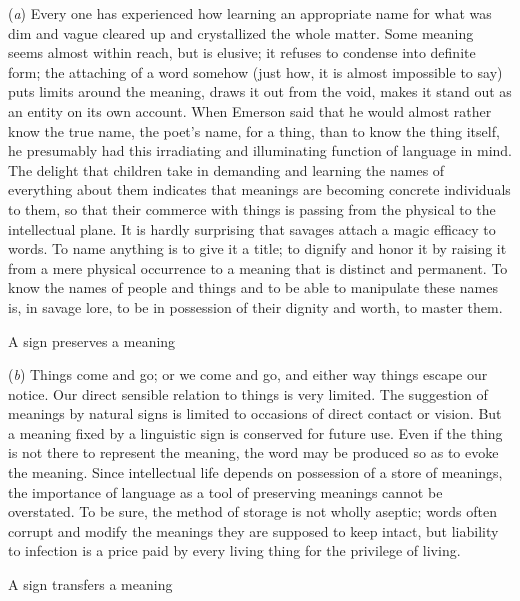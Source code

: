 \documentclass[letterpaper]{book}
\begin{document}
(\emph{a}) Every one has experienced how learning an appropriate name
for what was dim and vague cleared up and crystallized the whole matter.
Some meaning seems almost within reach, but is elusive; it refuses to
condense into definite form; the attaching of a word somehow (just how,
it is almost impossible to say) puts limits around the meaning, draws it
out from the void, makes it stand out as an entity on its own account.
When Emerson said that he would almost rather know the true name, the
poet's name, for a thing, than to know the thing itself, he presumably
had this irradiating and illuminating function of language in mind. The
delight that children take in demanding and learning the names of
everything about them indicates that meanings are becoming concrete
individuals to them, so that their commerce with things is passing from
the physical to the intellectual plane. It is hardly surprising that
savages attach a magic efficacy to words. To name anything is to give it
a title; to dignify and honor it
by
raising it from a mere physical occurrence to a meaning that is distinct
and permanent. To know the names of people and things and to be able to
manipulate these names is, in savage lore, to be in possession of their
dignity and worth, to master them.

A sign preserves a meaning

(\emph{b}) Things come and go; or we come and go, and either way things
escape our notice. Our direct sensible relation to things is very
limited. The suggestion of meanings by natural signs is limited to
occasions of direct contact or vision. But a meaning fixed by a
linguistic sign is conserved for future use. Even if the thing is not
there to represent the meaning, the word may be produced so as to evoke
the meaning. Since intellectual life depends on possession of a store of
meanings, the importance of language as a tool of preserving meanings
cannot be overstated. To be sure, the method of storage is not wholly
aseptic; words often corrupt and modify the meanings they are supposed
to keep intact, but liability to infection is a price paid by every
living thing for the privilege of living.



A sign transfers a meaning
\end{document}
